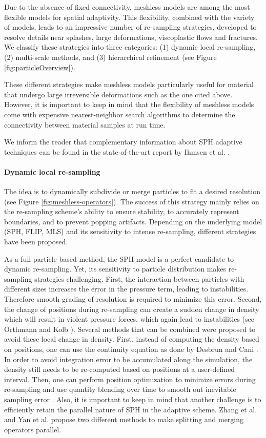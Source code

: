 Due to the absence of fixed connectivity, meshless models are among the most flexible models for spatial adaptivity. This flexibility, combined with the variety of models, leads to an impressive number of re-sampling strategies, developed to resolve details near splashes, large deformations, viscoplastic flows and fractures. We classify these strategies into three categories: (1) dynamic local re-sampling, (2) multi-scale methods, and (3) hierarchical refinement (see Figure \ref{fig:particleOverview}).

These different strategies make meshless models particularly useful for material that undergo large irreversible deformations such as the one cited above. However, it is important to keep in mind that the flexibility of meshless models come with expensive nearest-neighbor search algorithms to determine the connectivity between material samples at run time.

We inform the reader that complementary information about SPH adaptive techniques can be found in the state-of-the-art report by Ihmsen et al. \cite{Ihmsen2014:STAR}.

\paragraph*{Dynamic local re-sampling} The idea is to dynamically subdivide or merge particles to fit a desired resolution (see Figure \ref{fig:meshless-operators}). The success of this strategy mainly relies on the re-sampling scheme's ability to ensure stability, to accurately represent boundaries, and to prevent popping artifacts. Depending on the underlying model (SPH, FLIP, MLS) and its sensitivity to intense re-sampling, different strategies have been proposed.

As a full particle-based method, the SPH model is a perfect candidate to dynamic re-sampling. Yet, its sensitivity to particle distribution makes re-sampling strategies challenging. First, the interaction between particles with different sizes increases the error in the pressure term, leading to instabilities. Therefore smooth grading of resolution is required to minimize this error. Second, the change of positions during re-sampling can create a sudden change in density which will result in violent pressure forces, which again lead to instabilities (see Orthmann and Kolb \cite{Orthmann2012}).
Several methods that can be combined were proposed to avoid these local change in density. First, instead of computing the density based on positions, one can use the continuity equation as done by Desbrun and Cani \cite{Desbrun1999}. In order to avoid integration error to be accumulated along the simulation, the density still needs to be re-computed based on positions at a user-defined interval. Then, one can perform position optimization to minimize errors during re-sampling \cite{Adams2007} and use quantity blending over time to smooth out inevitable sampling error \cite{Orthmann2012}.
Also, it is important to keep in mind that another challenge is to efficiently retain the parallel nature of SPH in the adaptive scheme. Zhang et al. \cite{Zhang2008} and Yan et al. \cite{Yan2009} propose two different methods to make splitting and merging operators parallel.

